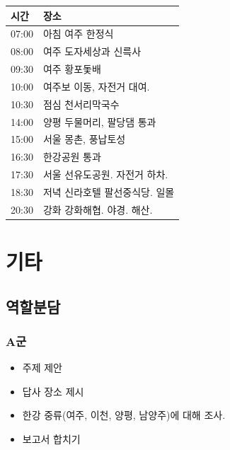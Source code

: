 \documentclass[chapter, oneside]{oblivoir}
\begin{document}
\begin{table}[ht]
    \begin{center}
    \begin{tabular}{rl}
    \multicolumn{1}{l}{시간}     & \multicolumn{1}{l}{장소} \\ \hline
    \multicolumn{1}{r|}{07:00} & 아침   여주 한정식         \\
    \multicolumn{1}{r|}{08:00} & 여주   도자세상과 신륵사      \\
    \multicolumn{1}{r|}{09:30} & 여주   황포돛배           \\
    \multicolumn{1}{r|}{10:00} & 여주보 이동, 자전거 대여.     \\
    \multicolumn{1}{r|}{10:30} & 점심   천서리막국수         \\
    \multicolumn{1}{r|}{14:00} & 양평 두물머리, 팔당댐 통과     \\
    \multicolumn{1}{r|}{15:00} & 서울 몽촌, 풍납토성         \\
    \multicolumn{1}{r|}{16:30} & 한강공원   통과           \\
    \multicolumn{1}{r|}{17:30} & 서울   선유도공원. 자전거 하차. \\
    \multicolumn{1}{r|}{18:30} & 저녁   신라호텔 팔선중식당. 일몰 \\
    \multicolumn{1}{r|}{20:30} & 강화   강화해협. 야경. 해산. 
    \end{tabular}   
    \end{center}
\end{table}





\chapter{기타}
\section{역할분담}
\subsection{A군}
\begin{itemize}
    \item 주제 제안
    \item 답사 장소 제시
    \item 한강 중류(여주, 이천, 양평, 남양주)에 대해 조사.
    \item {} 보고서 합치기
\end{itemize}
\end{document}

